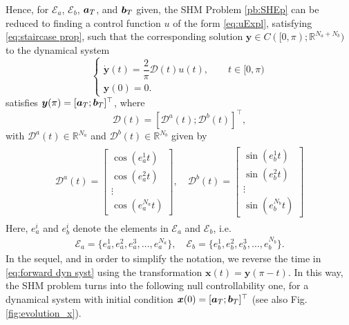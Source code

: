 \documentclass[twocolumn]{autart}    %
\begin{document}
Hence, for $\mathcal{E}_a$, $\mathcal{E}_b$, $\bm{a}_T$, and $\bm{b}_T$ given, the SHM Problem \ref{pb:SHEp} can be reduced to finding a control function $u$ of the form \eqref{eq:uExpl}, satisfying \eqref{eq:staircase prop}, such that the corresponding solution $\bm{y} \in C([0,\pi); \mathbb{R}^{N_a+N_b})$ to the dynamical system
\begin{equation}\label{eq:forward dyn syst}
	\begin{cases}
		\dot{\bm{y}}(t) = \dfrac{2}{\pi} \bm{\mathcal{D}}(t) u(t), \qquad  t\in [0,\pi)
		\\[5pt]
		\bm{y}(0) = 0.
	\end{cases}
\end{equation}
satisfies $\bm{y} (\pi) = [\bm{a}_T;\bm{b}_T]^\top$,	where
\begin{equation}\label{eq:Dynamics}
	\bm{\mathcal{D}}(t) = \left[ \bm{\mathcal{D}}^a(t); \bm{\mathcal{D}}^b(t) \right]^\top, 
\end{equation}
with $\bm{\mathcal{D}}^a(t) \in \mathbb{R}^{N_a} $ and $ \bm{\mathcal{D}}^b(t) \in \mathbb{R}^{N_b}$ given by
\begin{gather}\label{eq:DalphaDbeta}
	\begin{align}
		\bm{\mathcal{D}}^a(t) = 
		\begin{bmatrix} 
			\cos(e_a^1t) \\ \cos(e_a^2t) \\ \vdots \\ \cos(e_a^{N_a}t) 
		\end{bmatrix},
		\quad \bm{\mathcal{D}}^b(t) = 
		\begin{bmatrix} 
			\sin(e_b^1t) \\ \sin(e_b^2t) \\ \vdots \\ \sin(e_b^{N_b}t)
		\end{bmatrix} 
	\end{align} 
\end{gather}
Here, $e_a^i$ and $e_b^i$  denote the elements in $\mathcal{E}_a$ and  $\mathcal{E}_b$, i.e.
\begin{align*}
	\mathcal{E}_a = \{e_a^1,e_a^2,e_a^3,\dots,e_a^{N_a}\}, \quad \mathcal{E}_b = \{e_b^1,e_b^2,e_b^3,\dots,e_b^{N_b}\}.
\end{align*}
In the sequel, and in order to simplify the notation, we reverse the time in \eqref{eq:forward dyn syst} using the transformation $\bm{x} (t) = \bm{y}(\pi - t)$. In this way, the SHM problem turns into the following null controllability one, for a dynamical system with initial condition $\bm{x}(0) = [\bm{a}_T; \bm{b}_T]^\top$ (see also Fig. \ref{fig:evolution_x}).
\end{document}
